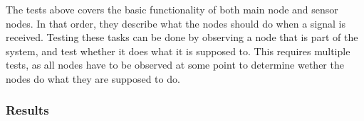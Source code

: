The tests above covers the basic functionality of both main node and sensor nodes. In that order, they describe what the nodes should do when a signal is received.
Testing these tasks can be done by observing a node that is part of the system, and test whether it does what it is supposed to. This requires multiple tests, as all nodes have to be observed at some point to determine wether the nodes do what they are supposed to do.

\subsubsection*{Results}

